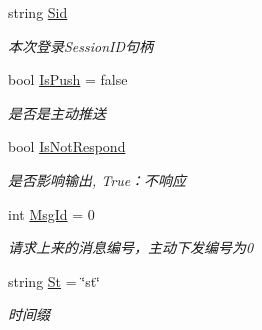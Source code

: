 \begin{DoxyCompactItemize}
string \mbox{\hyperlink{class_t_net_1_1_service_1_1_game_struct_a45f9f6a6f8a3e28ac168fa74fb56d074}{Sid}}
\begin{DoxyCompactList}\small\item\em 本次登录\+Session\+I\+D句柄 \end{DoxyCompactList}\item 
bool \mbox{\hyperlink{class_t_net_1_1_service_1_1_game_struct_aab499331ac40ee2a1442336e53eff43d}{Is\+Push}} = false
\begin{DoxyCompactList}\small\item\em 是否是主动推送 \end{DoxyCompactList}\item 
bool \mbox{\hyperlink{class_t_net_1_1_service_1_1_game_struct_afb8b3c8b058f33cc2fefba95650457d1}{Is\+Not\+Respond}}
\begin{DoxyCompactList}\small\item\em 是否影响输出, True：不响应 \end{DoxyCompactList}\item 
int \mbox{\hyperlink{class_t_net_1_1_service_1_1_game_struct_a42da07c6489f59ca944bfcb17745d8cd}{Msg\+Id}} = 0
\begin{DoxyCompactList}\small\item\em 请求上来的消息编号，主动下发编号为0 \end{DoxyCompactList}\item 
string \mbox{\hyperlink{class_t_net_1_1_service_1_1_game_struct_a374b8f46dada772985706a1c6907a6a0}{St}} = \char`\"{}st\char`\"{}
\begin{DoxyCompactList}\small\item\em 时间缀 \end{DoxyCompactList}\end{DoxyCompactItemize}
